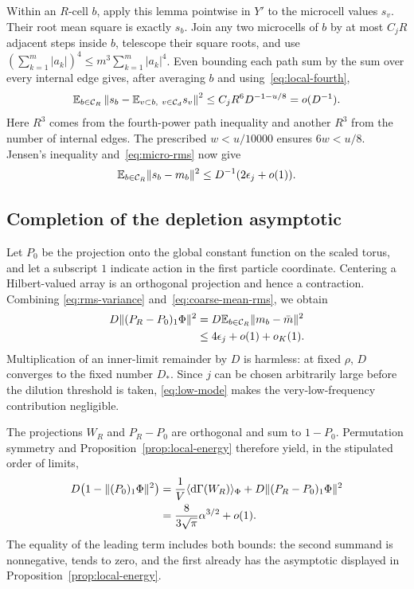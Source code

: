 Within an $R$-cell $b$, apply this lemma pointwise in $Y'$ to the
microcell values $s_v$. Their root mean square is exactly $s_b$.
Join any two microcells of $b$ by at most $C_jR$ adjacent steps inside
$b$, telescope their square roots, and use
$(\sum_{k=1}^m |a_k|)^4\le m^3\sum_{k=1}^m|a_k|^4$.
Even bounding each path sum by the sum over every internal edge gives,
after averaging $b$ and using~\eqref{eq:local-fourth},
\begin{equation}\label{eq:coarse-rms-comparison}
 \mathbb E_{b\in\mathcal C_R}
 \left\|s_b-\mathbb E_{v\subset b,\ v\in\mathcal C_d}s_v\right\|^2
 \le C_jR^6D^{-1-u/8}=o(D^{-1}).
\end{equation}
Here $R^3$ comes from the fourth-power path inequality and another $R^3$
from the number of internal edges. The prescribed $w<u/10000$ ensures
$6w<u/8$. Jensen's inequality and~\eqref{eq:micro-rms} now give
\begin{equation}\label{eq:coarse-mean-rms}
 \mathbb E_{b\in\mathcal C_R}\|s_b-m_b\|^2
 \le D^{-1}(2\epsilon_j+o(1)).
\end{equation}

\subsection{Completion of the depletion asymptotic}

Let $P_0$ be the projection onto the global constant function on the
scaled torus, and let a subscript $1$ indicate action in the first
particle coordinate. Centering a Hilbert-valued array is an orthogonal
projection and hence a contraction. Combining
\eqref{eq:rms-variance} and~\eqref{eq:coarse-mean-rms}, we obtain
\begin{equation}\label{eq:low-mode}
 \begin{split}
 D\|(P_R-P_0)_1\Phi\|^2
 &=D\mathbb E_{b\in\mathcal C_R}\|m_b-\bar m\|^2\\
 &\le4\epsilon_j+o(1)+o_K(1).
 \end{split}
\end{equation}
Multiplication of an inner-limit remainder by $D$ is harmless: at fixed
$\rho$, $D$ converges to the fixed number $D_*$. Since $j$ can be
chosen arbitrarily large before the dilution threshold is taken,
\eqref{eq:low-mode} makes the very-low-frequency contribution negligible.

The projections $W_R$ and $P_R-P_0$ are orthogonal and sum to $1-P_0$.
Permutation symmetry and Proposition~\ref{prop:local-energy} therefore
yield, in the stipulated order of limits,
\begin{equation}\label{eq:scaled-final-depletion}
 \begin{split}
 D\bigl(1-\|(P_0)_1\Phi\|^2\bigr)
 &=\frac1V\langle\mathrm d\Gamma(W_R)\rangle_\Phi
       +D\|(P_R-P_0)_1\Phi\|^2\\
 &=\frac8{3\sqrt\pi}\alpha^{3/2}+o(1).
 \end{split}
\end{equation}
The equality of the leading term includes both bounds: the second
summand is nonnegative, tends to zero, and the first already has the
asymptotic displayed in Proposition~\ref{prop:local-energy}.

